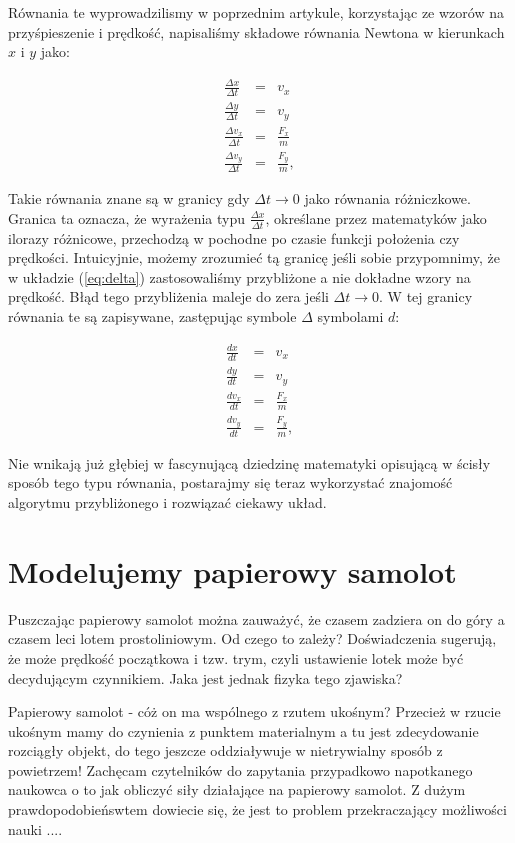 \documentclass[10pt,twocolumn]{article}
\begin{document}
Równania te wyprowadzilismy w poprzednim artykule, korzystając ze
wzorów na przyśpieszenie i prędkość, napisaliśmy składowe równania
Newtona w kierunkach $x$ i $y$ jako:
 
\begin{eqnarray}
\frac{ \Delta x}{\Delta t} &=& v_x \\ \nonumber
\frac{ \Delta y}{\Delta t} &=& v_y \\ \nonumber
\frac{ \Delta v_x}{\Delta t} &=& \frac{F_x}{m}\\ \nonumber
\frac{ \Delta v_y}{\Delta t} &=& \frac{F_y}{m},
\label{eq:delta} 
\end{eqnarray}

Takie równania znane są w granicy gdy $\Delta t\to 0$ jako równania
różniczkowe. Granica ta oznacza, że wyrażenia typu $ \frac{ \Delta
  x}{\Delta t}$, określane przez matematyków jako ilorazy różnicowe,
przechodzą w pochodne po czasie funkcji położenia czy
prędkości. Intuicyjnie, możemy zrozumieć tą granicę jeśli sobie
przypomnimy, że w układzie (\ref{eq:delta}) zastosowaliśmy przybliżone
a nie dokładne wzory na prędkość. Błąd tego przybliżenia maleje do
zera jeśli $ \Delta t\to 0$. W tej granicy równania te są zapisywane,
zastępując symbole $\Delta$ symbolami $d$:

\begin{eqnarray}
\frac{ dx}{dt} &=& v_x \\ \nonumber
\frac{ dy}{dt} &=& v_y \\ \nonumber
\frac{ dv_x}{dt} &=& \frac{F_x}{m}\\ \nonumber
\frac{ dv_y}{dt} &=& \frac{F_y}{m},
\label{eq:ode} 
\end{eqnarray}

Nie wnikają już głębiej w fascynującą dziedzinę matematyki opisującą w
ścisły sposób tego typu równania, postarajmy się teraz wykorzystać
znajomość algorytmu przybliżonego i rozwiązać ciekawy  układ.


\section{Modelujemy papierowy samolot }

Puszczając papierowy samolot można zauważyć, że czasem zadziera on do
góry a czasem leci lotem prostoliniowym. Od czego to zależy?
Doświadczenia sugerują, że może prędkość początkowa i tzw. trym, czyli
ustawienie lotek może być decydującym czynnikiem. Jaka jest jednak
fizyka tego zjawiska?

Papierowy samolot - cóż on ma wspólnego z rzutem ukośnym? Przecież w
rzucie ukośnym mamy do czynienia z punktem materialnym a tu jest
zdecydowanie rozciągły objekt, do tego jeszcze oddziaływuje w
nietrywialny sposób z powietrzem! Zachęcam czytelników do zapytania
przypadkowo napotkanego naukowca o to jak obliczyć siły działające na
papierowy samolot. Z dużym prawdopodobieńswtem dowiecie się, że jest
to problem przekraczający możliwości nauki ....
\end{document}
